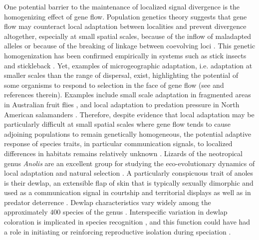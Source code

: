 One potential barrier to the maintenance of localized signal divergence is the homogenizing effect of gene flow. Population genetics theory suggests that gene flow may counteract local adaptation between localities and prevent divergence altogether, especially at small spatial scales, because of the inflow of maladapted alleles or because of the breaking of linkage between coevolving loci \citep{Felsenstein1976, Garcia-Ramos1997, Dieckmann1999, Lenormand2002, Hendry2007}. This genetic homogenization has been confirmed empirically in systems such as stick insects \citep{Nosil2004} and stickleback \citep{Hendry2007a}. Yet, examples of microgeographic adaptation, i.e. adaptation at smaller scales than the range of dispersal, exist, highlighting the potential of some organisms to respond to selection in the face of gene flow (see \citealt{Richardson2014} and references therein). Examples include small scale adaptation in fragmented areas in Australian fruit flies \citep{Willi2012}, and local adaptation to predation pressure in North American salamanders \citep{Richardson2013}. Therefore, despite evidence that local adaptation may be particularly difficult at small spatial scales where gene flow tends to cause adjoining populations to remain genetically homogeneous, the potential adaptive response of species traits, in particular communication signals, to localized differences in habitats remains relatively unknown \citep{Richardson2014}. Lizards of the neotropical genus \textit{Anolis} are an excellent group for studying the eco-evolutionary dynamics of local adaptation and natural selection \citep{Losos2009}. A particularly conspicuous trait of anoles is their dewlap, an extensible flap of skin that is typically sexually dimorphic and used as a communication signal in courtship \citep{Sigmund1983, Driessens2014, Driessens2015} and territorial displays \citep{Losos1985, Macedonia1994, Macedonia2013} as well as in predator deterrence \citep{Leal1995, Leal1997, Leal1997a}. Dewlap characteristics vary widely among the approximately $400$ species of the genus \citep{Nicholson2007}. Interspecific variation in dewlap coloration is implicated in species recognition \citep{Rand1970, Williams1969, Williams1977, Losos1985, Macedonia1994, Fleishman2000, Macedonia2013}, and this function could have had a role in initiating or reinforcing reproductive isolation during speciation \citep{Lambert2013, Geneva2015, Ng2017}.\\

